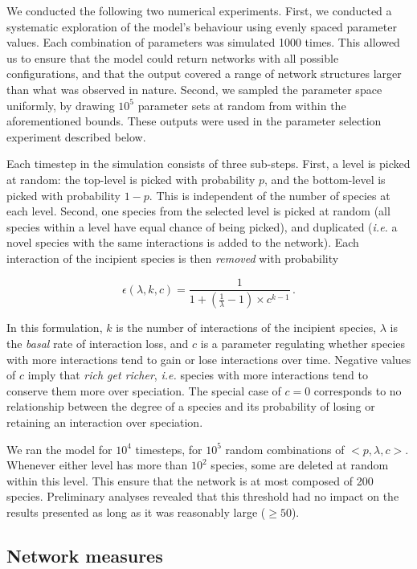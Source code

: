 \documentclass[12pt]{article}
\begin{document}
We conducted the following two numerical experiments. First, we
conducted a systematic exploration of the model's behaviour using evenly
spaced parameter values. Each combination of parameters was simulated
1000 times. This allowed us to ensure that the model could return
networks with all possible configurations, and that the output covered a
range of network structures larger than what was observed in nature.
Second, we sampled the parameter space uniformly, by drawing \(10^5\)
parameter sets at random from within the aforementioned bounds. These
outputs were used in the parameter selection experiment described below.

Each timestep in the simulation consists of three sub-steps. First, a
level is picked at random: the top-level is picked with probability
\(p\), and the bottom-level is picked with probability \(1-p\). This is
independent of the number of species at each level. Second, one species
from the selected level is picked at random (all species within a level
have equal chance of being picked), and duplicated (\emph{i.e.} a novel
species with the same interactions is added to the network). Each
interaction of the incipient species is then \emph{removed} with
probability

\begin{equation}
\epsilon(\lambda, k, c) = \frac{1}{1+\left(\frac{1}{\lambda}-1\right)\times c^{k-1}} \,.
\end{equation}

In this formulation, \(k\) is the number of interactions of the
incipient species, \(\lambda\) is the \emph{basal} rate of interaction
loss, and \(c\) is a parameter regulating whether species with more
interactions tend to gain or lose interactions over time. Negative
values of \(c\) imply that \emph{rich get richer}, \emph{i.e.} species
with more interactions tend to conserve them more over speciation. The
special case of \(c = 0\) corresponds to no relationship between the
degree of a species and its probability of losing or retaining an
interaction over speciation.

We ran the model for \(10^4\) timesteps, for \(10^5\) random
combinations of \(<p, \lambda, c>\). Whenever either level has more than
\(10^2\) species, some are deleted at random within this level. This
ensure that the network is at most composed of 200 species. Preliminary
analyses revealed that this threshold had no impact on the results
presented as long as it was reasonably large (\(\geq 50\)).

\subsection{Network measures}\label{network-measures}
\end{document}
